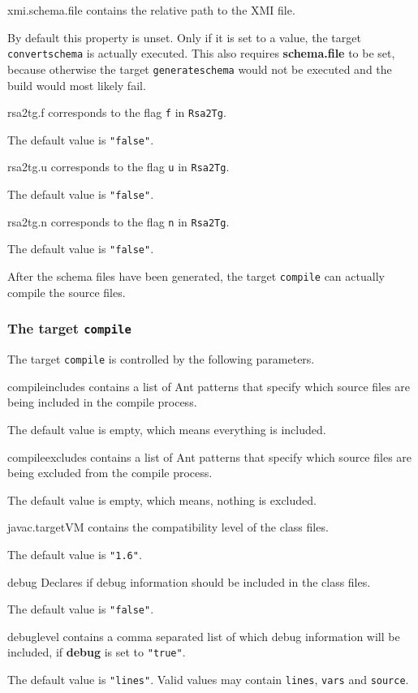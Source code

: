 \documentclass[a4paper,twoside,11pt,bibtotoc]{article}
\begin{document}
\begin{description*}
	\item[xmi.schema.file] contains the relative path to the XMI file.\par By default this property is unset. Only if it is set to a value, the target \texttt{convertschema} is actually executed. This also requires \textbf{schema.file} to be set, because otherwise the target \texttt{generateschema} would not be executed and the build would most likely fail.
	\item[rsa2tg.f] corresponds to the flag \texttt{f} in \texttt{Rsa2Tg}.\par The default value is \texttt{"false"}.
	\item[rsa2tg.u] corresponds to the flag \texttt{u} in \texttt{Rsa2Tg}.\par The default value is \texttt{"false"}.
	\item[rsa2tg.n] corresponds to the flag \texttt{n} in \texttt{Rsa2Tg}.\par The default value is \texttt{"false"}.
\end{description*}


After the schema files have been generated, the target \texttt{compile} can actually compile the source files.
\subsubsection{The target \texttt{compile}}
\label{sec:compile}
The target \texttt{compile} is controlled by the following parameters.

\begin{description*}
	\item[compileincludes] contains a list of Ant patterns that specify which source files are being included in the compile process.\par The default value is empty, which means everything is included.
	\item[compileexcludes] contains a list of Ant patterns that specify which source files are being excluded from the compile process.\par The default value is empty, which means, nothing is excluded.
	\item[javac.targetVM] contains the compatibility level of the class files.\par The default value is \texttt{"1.6"}.
	\item[debug] Declares if debug information should be included in the class files.\par The default value is \texttt{"false"}.
	\item[debuglevel] contains a comma separated list of which debug information will be included, if \textbf{debug} is set to \texttt{"true"}.\par The default value is \texttt{"lines"}. Valid values may contain \texttt{lines}, \texttt{vars} and \texttt{source}.
\end{description*}
\end{document}
